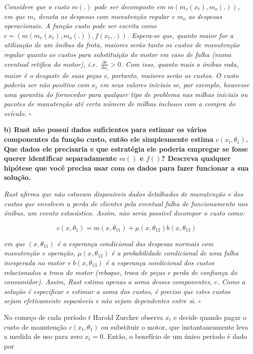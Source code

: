 \documentclass[12pt,a4paper]{article}
\begin{document}
\emph{Considere que o custo \(m(.)\) pode ser decomposto em
\(m(m_r(x_t),m_o(.))\), em que \(m_r\) denota as despesas com manutenção
regular e \(m_o\) as despesas operacionais. A função custo pode ser
escrita como \(c=(m(m_r(x_t),m_o(.)),f(x_t,.))\). Espera-se que, quanto
maior for a utilização de um ônibus da frota, maiores serão tanto os
custos de manutenção regular quanto os custos para substituição do motor
em caso de falha (numa eventual retifica do motor),
i.e.~\(\frac{\partial c}{\partial x_t} > 0\). Com isso, quanto mais o
ônibus roda, maior é o desgaste de suas peças e, portanto, maiores serão
os custos. O custo poderia ser não positivo com \(x_t\) em seus valores
iniciais se, por exemplo, houvesse uma garantia do fornecedor para
qualquer tipo de problema nas milhas iniciais ou pacotes de manutenção
até certo número de milhas inclusos com a compra do veículo.
\(\square\)}

\textbf{b) Rust não possui dados suficientes para estimar os vários
componentes da função custo, então ele simplesmente estima
\(c(x_t, \theta_1)\). Que dados ele precisaria e que estratégia ele
poderia empregar se fosse querer identificar separadamente \(m()\) e
\(f()\)? Descreva qualquer hipótese que você precisa usar com os dados
para fazer funcionar a sua solução.}

\emph{Rust afirma que não estavam disponíveis dados detalhados de
manutenção e dos custos que envolvem a perda de clientes pela eventual
falha de funcionamento nos ônibus, um evento estocástico. Assim, não
seria possível decompor o custo como:}

\[
c(x,\theta_1) = m(x,\theta_{11})+\mu(x,\theta_{12})b(x,\theta_{13})
\]

\emph{em que \((x,\theta_{11})\) é a esperança condicional das despesas
normais com manutenção e operação, \(\mu(x,\theta_{12})\) é a
probabilidade condicional de uma falha inesperada no motor e
\(b(x,\theta_{13})\) é a esperança condicional dos custos relacionados a
troca do motor (reboque, troca de peças e perda de confiança do
consumidor). Assim, Rust estima apenas a soma desses componentes, \(c\).
Como a solução é especificar e estimar a soma dos custos, é preciso que
estes custos sejam efetivamente separáveis e não sejam dependentes entre
si. \(\square\)}

No começo de cada período \(t\) Harold Zurcher observa \(x_t\) e decide
quando pagar o custo de manutenção \(c(x_t, \theta_1)\) ou substituir o
motor, que instantaneamente leva a medida de uso para zero \(x_t = 0\).
Então, o benefício de um único período é dado por
\end{document}
